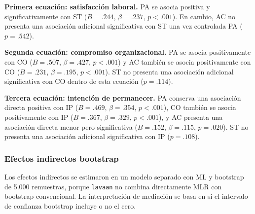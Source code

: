 \documentclass[12pt,letterpaper]{article}
\begin{document}
\textbf{Primera ecuación: satisfacción laboral.} PA se asocia positiva y significativamente con ST ($B=.244$, $\beta=.237$, $p<.001$). En cambio, AC no presenta una asociación adicional significativa con ST una vez controlada PA ($p=.542$).

\textbf{Segunda ecuación: compromiso organizacional.} PA se asocia positivamente con CO ($B=.507$, $\beta=.427$, $p<.001$) y AC también se asocia positivamente con CO ($B=.231$, $\beta=.195$, $p<.001$). ST no presenta una asociación adicional significativa con CO dentro de esta ecuación ($p=.114$).

\textbf{Tercera ecuación: intención de permanecer.} PA conserva una asociación directa positiva con IP ($B=.469$, $\beta=.354$, $p<.001$), CO también se asocia positivamente con IP ($B=.367$, $\beta=.329$, $p<.001$), y AC presenta una asociación directa menor pero significativa ($B=.152$, $\beta=.115$, $p=.020$). ST no presenta una asociación adicional significativa con IP ($p=.108$).

\subsubsection{Efectos indirectos bootstrap}

Los efectos indirectos se estimaron en un modelo separado con ML y bootstrap de 5.000 remuestras, porque \texttt{lavaan} no combina directamente MLR con bootstrap convencional. La interpretación de mediación se basa en si el intervalo de confianza bootstrap incluye o no el cero.

\begin{table}[H]
\centering
\caption{Efectos indirectos bootstrap hacia intención de permanecer}
\end{table}
\end{document}
